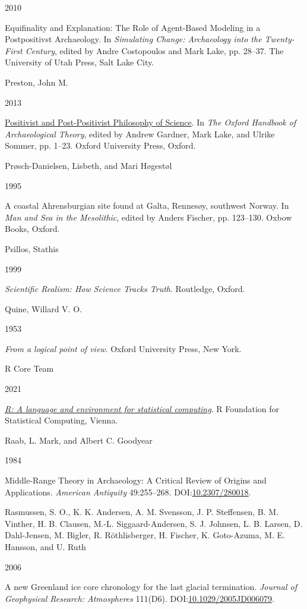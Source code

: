 \documentclass[
  a4paper,
  oneside]{uiophdthesis}
\newlength{\cslhangindent}
\newlength{\csllabelwidth}
\newlength{\cslentryspacingunit} %
\newenvironment{CSLReferences}[2] %
 {%
  \setlength{\parindent}{0pt}
  \ifodd #1
  \let\oldpar\par
  \def\par{\hangindent=\cslhangindent\oldpar}
  \fi
  \setlength{\parskip}{#2\cslentryspacingunit}
 }%
 {}
\newcommand{\CSLBlock}[1]{#1\hfill\break}
\newcommand{\CSLLeftMargin}[1]{\parbox[t]{\csllabelwidth}{#1}}
\newcommand{\CSLRightInline}[1]{\parbox[t]{\linewidth - \csllabelwidth}{#1}\break}
\begin{document}
\begin{CSLReferences}{0}{0}
\leavevmode{}%
\CSLLeftMargin{ 2010 }
\CSLRightInline{{Equifinality and Explanation: The Role of Agent-Based Modeling in a Postpositivst Archaeology}. In \emph{{Simulating Change: Archaeology into the Twenty-First Century}}, edited by Andre Costopoulos and Mark Lake, pp. 28--37. The University of Utah Press, Salt Lake City.}

\leavevmode{}%
\CSLBlock{Preston, John M.}
\CSLLeftMargin{ 2013}
\CSLRightInline{\href{https://doi.org/10.1093/oxfordhb/9780199567942.013.031}{{Positivist and Post-Positivist Philosophy of Science}}. In \emph{{The Oxford Handbook of Archaeological Theory}}, edited by Andrew Gardner, Mark Lake, and Ulrike Sommer, pp. 1--23. Oxford University Press, Oxford.}

\leavevmode{}%
\CSLBlock{Prøsch-Danielsen, Lisbeth, and Mari Høgestøl}
\CSLLeftMargin{ 1995}
\CSLRightInline{{A coastal Ahrensburgian site found at Galta, Rennesøy, southwest Norway}. In \emph{{Man and Sea in the Mesolithic}}, edited by Anders Fischer, pp. 123--130. Oxbow Books, Oxford.}

\leavevmode{}%
\CSLBlock{Psillos, Stathis}
\CSLLeftMargin{ 1999}
\CSLRightInline{\emph{{Scientific Realism: How Science Tracks Truth}}. Routledge, Oxford.}

\leavevmode{}%
\CSLBlock{Quine, Willard V. O.}
\CSLLeftMargin{ 1953}
\CSLRightInline{\emph{{From a logical point of view}}. Oxford University Press, New York.}

\leavevmode{}%
\CSLBlock{R Core Team}
\CSLLeftMargin{ 2021}
\CSLRightInline{\emph{\href{https://www.R-project.org/}{R: A language and environment for statistical computing}}. R Foundation for Statistical Computing, Vienna.}

\leavevmode{}%
\CSLBlock{Raab, L. Mark, and Albert C. Goodyear}
\CSLLeftMargin{ 1984}
\CSLRightInline{{Middle-Range Theory in Archaeology: A Critical Review of Origins and Applications}. \emph{American Antiquity} 49:255--268. DOI:\href{https://doi.org/10.2307/280018}{10.2307/280018}.}

\leavevmode{}%
\CSLBlock{Rasmussen, S. O., K. K. Andersen, A. M. Svensson, J. P. Steffensen, B. M. Vinther, H. B. Clausen, M.-L. Siggaard-Andersen, S. J. Johnsen, L. B. Larsen, D. Dahl-Jensen, M. Bigler, R. Röthlisberger, H. Fischer, K. Goto-Azuma, M. E. Hansson, and U. Ruth}
\CSLLeftMargin{ 2006}
\CSLRightInline{{A new Greenland ice core chronology for the last glacial termination}. \emph{Journal of Geophysical Research: Atmospheres} 111(D6). DOI:\href{https://doi.org/10.1029/2005JD006079}{10.1029/2005JD006079}.}


\end{CSLReferences}
\end{document}
